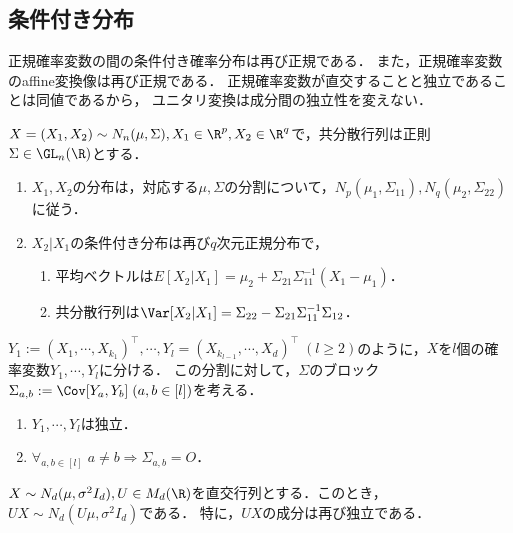 \documentclass[uplatex,dvipdfmx]{jsreport}
\begin{document}
\subsection{条件付き分布}

\begin{tcolorbox}[colframe=ForestGreen, colback=ForestGreen!10!white,breakable,colbacktitle=ForestGreen!40!white,coltitle=black,fonttitle=\bfseries\sffamily,
title=]
    正規確率変数の間の条件付き確率分布は再び正規である．
    また，正規確率変数のaffine変換像は再び正規である．
    正規確率変数が直交することと独立であることは同値であるから，
    ユニタリ変換は成分間の独立性を変えない．
\end{tcolorbox}

\begin{theorem}[正規確率変数同士の条件付き分布]
    $X=(X_1,X_2)\sim N_n(\mu,\Sigma),X_1\in\R^p,X_2\in\R^q$で，共分散行列は正則$\Sigma\in\GL_n(\R)$とする．
    \begin{enumerate}
        \item $X_1,X_2$の分布は，対応する$\mu,\Sigma$の分割について，$N_p(\mu_1,\Sigma_{11}),N_q(\mu_2,\Sigma_{22})$に従う．
        \item $X_2|X_1$の条件付き分布は再び$q$次元正規分布で，
        \begin{enumerate}
            \item 平均ベクトルは$E[X_2|X_1]=\mu_2+\Sigma_{21}\Sigma_{11}^{-1}(X_1-\mu_1)$．
            \item 共分散行列は$\Var[X_2|X_1]=\Sigma_{22}-\Sigma_{21}\Sigma_{11}^{-1}\Sigma_{12}$．
        \end{enumerate}
    \end{enumerate}
\end{theorem}

\begin{proposition}[多次元正規確率変数の成分間の独立性]
    $Y_1:=(X_1,\cdots,X_{k_1})^\top,\cdots,Y_l=(X_{k_{l-1}},\cdots,X_d)^\top\;(l\ge 2)$のように，$X$を$l$個の確率変数$Y_1,\cdots,Y_l$に分ける．
    この分割に対して，$\Sigma$のブロック$\Sigma_{a,b}:=\Cov[Y_a,Y_b]\;(a,b\in[l])$を考える．
    \begin{enumerate}
        \item $Y_1,\cdots,Y_l$は独立．
        \item $\forall_{a,b\in[l]}\;a\ne b\Rightarrow\Sigma_{a,b}=O$．
    \end{enumerate}
\end{proposition}

\begin{corollary}[ユニタリ変換は成分間の独立性を変えない]
    $X\sim N_d(\mu,\sigma^2I_d),U\in M_d(\R)$を直交行列とする．このとき，$UX\sim N_d(U\mu,\sigma^2I_d)$である．
    特に，$UX$の成分は再び独立である．
\end{corollary}
\end{document}
